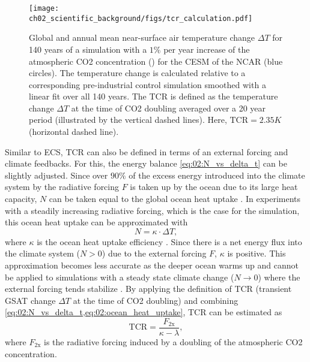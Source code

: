\begin{figure}[t]
  \centering
  \texttt{[image: 
    ch02\_scientific\_background/figs/tcr\_calculation.pdf]}
  \caption{Global and annual mean near-surface air temperature change $\Delta
    T$ for 140 years of a simulation with a $1 \unit{\%}$ per year increase of
    the atmospheric \acs{CO2} concentration (\onepctcotwo{}) for the \acf{CESM}
    of the \acf{NCAR} (blue circles). The temperature change is calculated
    relative to a corresponding pre-industrial control simulation smoothed
    with a linear fit over all 140 years. The \acf{TCR} is defined as the
    temperature change $\Delta T$ at the time of \acs{CO2} doubling averaged
    over a 20 year period (illustrated by the vertical dashed lines). Here,
    $\text{TCR} = 2.35 \unit{K}$ (horizontal dashed line).}
  \label{fig:02:tcr}
\end{figure}

Similar to \ac{ECS}, \ac{TCR} can also be defined in terms of an external
forcing and climate feedbacks. For this, the energy balance
\cref{eq:02:N_vs_delta_t} can be slightly adjusted. Since over $90 \unit{\%}$
of the excess energy introduced into the climate system by the radiative
forcing $F$ is taken up by the ocean due to its large heat capacity, $N$ can be
taken equal to the global ocean heat uptake \autocite{Knutti2017}. In
experiments with a steadily increasing radiative forcing, which is the case for
the \onepctcotwo{} simulation, this ocean heat uptake can be approximated with
\begin{equation}
  N = \kappa \cdot \Delta T,
  \label{eq:02:ocean_heat_uptake}
\end{equation}
where $\kappa$ is the ocean heat uptake efficiency \autocite{Gregory2008}.
Since there is a net energy flux into the climate system ($N > 0$) due to the
external forcing $F$, $\kappa$ is positive. This approximation becomes less
accurate as the deeper ocean warms up and cannot be applied to simulations with
a steady state climate change ($N \to 0$) where the external forcing tends
stabilize \autocite{Gregory2009}. By applying the definition of \ac{TCR}
(transient \ac{GSAT} change $\Delta T$ at the time of \ac{CO2} doubling) and
combining \cref{eq:02:N_vs_delta_t,eq:02:ocean_heat_uptake}, \ac{TCR} can be
estimated as
\begin{equation}
  \text{TCR} = \frac{F_\text{2x}}{\kappa - \lambda},
  \label{eq:02:tcr}
\end{equation}
where $F_\text{2x}$ is the radiative forcing induced by a doubling of the
atmospheric \ac{CO2} concentration.

